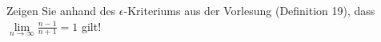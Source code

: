 \item Zeigen Sie anhand des $\epsilon$-Kriteriums aus der Vorlesung (Definition 19), dass $\lim\limits_{n\to\infty} \frac{n-1}{n+1} = 1$ gilt!
